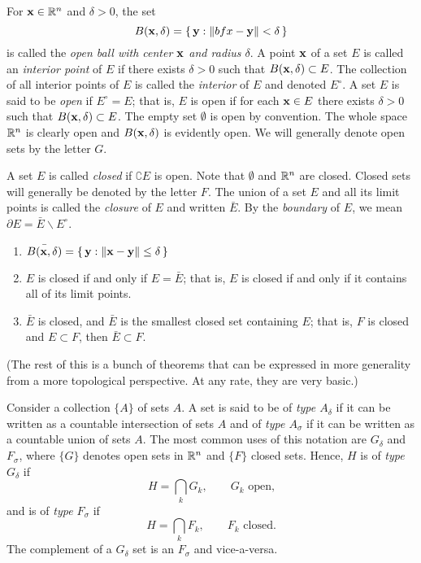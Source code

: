 For $\mathbf{x}\in\mathbb{R}^n$ and $\delta>0$, the set
\begin{equation}
\label{eq:open-ball-r-n}
B(\mathbf{x},\delta)=\left\{\,\mathbf{y}:\|bfx-\mathbf{y}\|<\delta\,\right\}
\end{equation}
is called the \emph{open ball with center $\mathbf{x}$ and radius $\delta$}. A
point $\mathbf{x}$ of a set $E$ is called an \emph{interior point} of $E$ if
there exists $\delta>0$ such that $B(\mathbf{x},\delta)\subset E$. The collection
of all interior points of $E$ is called the \emph{interior} of $E$ and
denoted $E^\circ$. A set $E$ is said to be \emph{open} if $E^\circ=E$; that
is, $E$ is open if for each $\mathbf{x}\in E$ there exists $\delta>0$ such that
$B(\mathbf{x},\delta)\subset E$. The empty set $\emptyset$ is open by
convention. The whole space $\mathbb{R}^n$ is clearly open and $B(\mathbf{x},\delta)$
is evidently open. We will generally denote open sets by the letter $G$.

A set $E$ is called \emph{closed} if $\complement E$ is open. Note that
$\emptyset$ and $\mathbb{R}^n$ are closed. Closed sets will generally be denoted
by the letter $F$. The union of a set $E$ and all its limit points is
called the \emph{closure} of $E$ and written $\bar E$. By the
\emph{boundary} of $E$, we mean $\partial E= \bar E\smallsetminus
E^\circ$.
\begin{theorem}[1.5]
\begin{enumerate}[label=\textnormal{(\roman*)}]
\item $\bar{B(\mathbf{x},\delta)}=\left\{\,\mathbf{y}:\|\mathbf{x}-\mathbf{y}\|\leq\delta\, \right\}$
\item $E$ is closed if and only if $E=\bar E$; that is, $E$ is closed if
  and only if it contains all of its limit points.
\item $\bar E$ is closed, and $\bar E$ is the smallest closed set
  containing $E$; that is, $F$ is closed and $E\subset F$, then $\bar
  E\subset F$.
\end{enumerate}
\end{theorem}

(The rest of this is a bunch of theorems that can be expressed in more
generality from a more topological perspective. At any rate, they are very
basic.)

Consider a collection $\{A\}$ of sets $A$. A set is said to be of \emph{type
$A_\delta$} if it can be written as a countable intersection of sets $A$
and of \emph{type $A_\sigma$} if it can be written as a countable union of
sets $A$. The most common uses of this notation are $G_\delta$ and
$F_\sigma$, where $\{G\}$ denotes open sets in $\mathbb{R}^n$ and $\{F\}$ closed
sets. Hence, $H$ is of \emph{type $G_\delta$} if
\begin{equation}
  \label{eq:G-delta}
H=\bigcap_k G_k,\qquad \text{$G_k$ open,}
\end{equation}
and is of \emph{type $F_\sigma$} if
\begin{equation}
  \label{eq:F-sigma}
H=\bigcap_k F_k,\qquad\text{$F_k$ closed.}
\end{equation}
The complement of a $G_\delta$ set is an $F_\sigma$ and vice-a-versa.

